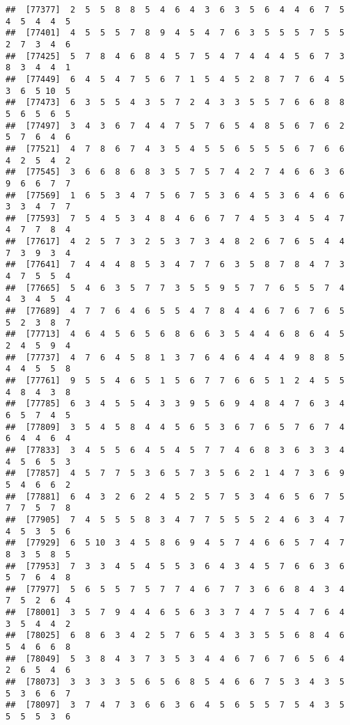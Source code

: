 \documentclass[
]{book}
\begin{document}
\begin{verbatim}
##  [77377]  2  5  5  8  8  5  4  6  4  3  6  3  5  6  4  4  6  7  5  4  5  4  4  5
##  [77401]  4  5  5  5  7  8  9  4  5  4  7  6  3  5  5  5  7  5  5  2  7  3  4  6
##  [77425]  5  7  8  4  6  8  4  5  7  5  4  7  4  4  4  5  6  7  3  8  3  4  4  1
##  [77449]  6  4  5  4  7  5  6  7  1  5  4  5  2  8  7  7  6  4  5  3  6  5 10  5
##  [77473]  6  3  5  5  4  3  5  7  2  4  3  3  5  5  7  6  6  8  8  5  6  5  6  5
##  [77497]  3  4  3  6  7  4  4  7  5  7  6  5  4  8  5  6  7  6  2  5  7  6  4  6
##  [77521]  4  7  8  6  7  4  3  5  4  5  5  6  5  5  5  6  7  6  6  4  2  5  4  2
##  [77545]  3  6  6  8  6  8  3  5  7  5  7  4  2  7  4  6  6  3  6  9  6  6  7  7
##  [77569]  1  6  5  3  4  7  5  6  7  5  3  6  4  5  3  6  4  6  6  3  3  4  7  7
##  [77593]  7  5  4  5  3  4  8  4  6  6  7  7  4  5  3  4  5  4  7  4  7  7  8  4
##  [77617]  4  2  5  7  3  2  5  3  7  3  4  8  2  6  7  6  5  4  4  7  3  9  3  4
##  [77641]  7  4  4  4  8  5  3  4  7  7  6  3  5  8  7  8  4  7  3  4  7  5  5  4
##  [77665]  5  4  6  3  5  7  7  3  5  5  9  5  7  7  6  5  5  7  4  4  3  4  5  4
##  [77689]  4  7  7  6  4  6  5  5  4  7  8  4  4  6  7  6  7  6  5  5  2  3  8  7
##  [77713]  4  6  4  5  6  5  6  8  6  6  3  5  4  4  6  8  6  4  5  2  4  5  9  4
##  [77737]  4  7  6  4  5  8  1  3  7  6  4  6  4  4  4  9  8  8  5  4  4  5  5  8
##  [77761]  9  5  5  4  6  5  1  5  6  7  7  6  6  5  1  2  4  5  5  4  8  4  3  8
##  [77785]  6  3  4  5  5  4  3  3  9  5  6  9  4  8  4  7  6  3  4  6  5  7  4  5
##  [77809]  3  5  4  5  8  4  4  5  6  5  3  6  7  6  5  7  6  7  4  6  4  4  6  4
##  [77833]  3  4  5  5  6  4  5  4  5  7  7  4  6  8  3  6  3  3  4  4  5  6  5  3
##  [77857]  4  5  7  7  5  3  6  5  7  3  5  6  2  1  4  7  3  6  9  5  4  6  6  2
##  [77881]  6  4  3  2  6  2  4  5  2  5  7  5  3  4  6  5  6  7  5  7  7  5  7  8
##  [77905]  7  4  5  5  5  8  3  4  7  7  5  5  5  2  4  6  3  4  7  4  5  3  5  6
##  [77929]  6  5 10  3  4  5  8  6  9  4  5  7  4  6  6  5  7  4  7  8  3  5  8  5
##  [77953]  7  3  3  4  5  4  5  5  3  6  4  3  4  5  7  6  6  3  6  5  7  6  4  8
##  [77977]  5  6  5  5  7  5  7  7  4  6  7  7  3  6  6  8  4  3  4  7  5  2  6  4
##  [78001]  3  5  7  9  4  4  6  5  6  3  3  7  4  7  5  4  7  6  4  3  5  4  4  2
##  [78025]  6  8  6  3  4  2  5  7  6  5  4  3  3  5  5  6  8  4  6  5  4  6  6  8
##  [78049]  5  3  8  4  3  7  3  5  3  4  4  6  7  6  7  6  5  6  4  2  6  5  4  6
##  [78073]  3  3  3  3  5  6  5  6  8  5  4  6  6  7  5  3  4  3  5  5  3  6  6  7
##  [78097]  3  7  4  7  3  6  6  3  6  4  5  6  5  5  7  5  4  3  5  5  5  5  3  6

\end{verbatim}
\end{document}
